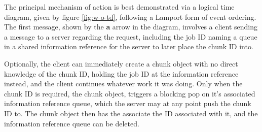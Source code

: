\documentclass[a4paper,10pt]{article}
\begin{document}
The principal mechanism of action is best demonstrated via a logical time
diagram, given by figure \ref{fig:w-o-td}, following a Lamport form of
event ordering\cite{lamport1978ordering}.
The first message, shown by the \textbf{a} arrow in the diagram, involves a
client sending a message to a server regarding the request, including the job
ID naming a queue in a shared information reference for the server to later
place the chunk ID into.

Optionally, the client can immediately create a chunk object with no direct
knowledge of the chunk ID, holding the job ID at the information reference
instead, and the client continues whatever work it was doing.
Only when the chunk ID is required, the chunk object, triggers a blocking pop
on it's associated information reference queue, which the server may
at any point push the chunk ID to.
The chunk object then has the associate the ID associated with it, and the
information reference queue can be deleted.
\end{document}

